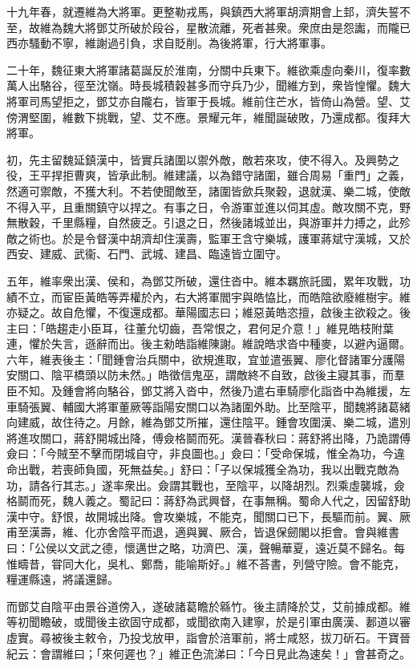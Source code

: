 \begin{pinyinscope}
十九年春，就遷維為大將軍。更整勒戎馬，與鎮西大將軍胡濟期會上邽，濟失誓不至，故維為魏大將鄧艾所破於段谷，星散流離，死者甚衆。衆庶由是怨讟，而隴已西亦騷動不寧，維謝過引負，求自貶削。為後將軍，行大將軍事。

二十年，魏征東大將軍諸葛誕反於淮南，分關中兵東下。維欲乘虛向秦川，復率數萬人出駱谷，徑至沈嶺。時長城積穀甚多而守兵乃少，聞維方到，衆皆惶懼。魏大將軍司馬望拒之，鄧艾亦自隴右，皆軍于長城。維前住芒水，皆倚山為營。望、艾傍渭堅圍，維數下挑戰，望、艾不應。景耀元年，維聞誕破敗，乃還成都。復拜大將軍。

初，先主留魏延鎮漢中，皆實兵諸圍以禦外敵，敵若來攻，使不得入。及興勢之役，王平捍拒曹爽，皆承此制。維建議，以為錯守諸圍，雖合周易「重門」之義，然適可禦敵，不獲大利。不若使聞敵至，諸圍皆歛兵聚穀，退就漢、樂二城，使敵不得入平，且重關鎮守以捍之。有事之日，令游軍並進以伺其虛。敵攻關不克，野無散穀，千里縣糧，自然疲乏。引退之日，然後諸城並出，與游軍并力搏之，此殄敵之術也。於是令督漢中胡濟却住漢壽，監軍王含守樂城，護軍蔣斌守漢城，又於西安、建威、武衞、石門、武城、建昌、臨遠皆立圍守。

五年，維率衆出漢、侯和，為鄧艾所破，還住沓中。維本羈旅託國，累年攻戰，功績不立，而宦臣黃皓等弄權於內，右大將軍閻宇與皓恊比，而皓陰欲廢維樹宇。維亦疑之。故自危懼，不復還成都。華陽國志曰；維惡黃皓恣擅，啟後主欲殺之。後主曰：「皓趨走小臣耳，往董允切齒，吾常恨之，君何足介意！」維見皓枝附葉連，懼於失言，遜辭而出。後主勑皓詣維陳謝。維說皓求沓中種麥，以避內逼爾。六年，維表後主：「聞鍾會治兵關中，欲規進取，宜並遣張翼、廖化督諸軍分護陽安關口、陰平橋頭以防未然。」皓徵信鬼巫，謂敵終不自致，啟後主寢其事，而羣臣不知。及鍾會將向駱谷，鄧艾將入沓中，然後乃遣右車騎廖化詣沓中為維援，左車騎張翼、輔國大將軍董厥等詣陽安關口以為諸圍外助。比至陰平，聞魏將諸葛緒向建威，故住待之。月餘，維為鄧艾所摧，還住陰平。鍾會攻圍漢、樂二城，遣別將進攻關口，蔣舒開城出降，傅僉格鬬而死。漢晉春秋曰：蔣舒將出降，乃詭謂傅僉曰：「今賊至不擊而閉城自守，非良圖也。」僉曰：「受命保城，惟全為功，今違命出戰，若喪師負國，死無益矣。」舒曰：「子以保城獲全為功，我以出戰克敵為功，請各行其志。」遂率衆出。僉謂其戰也，至陰平，以降胡烈。烈乘虛襲城，僉格鬬而死，魏人義之。蜀記曰：蔣舒為武興督，在事無稱。蜀命人代之，因留舒助漢中守。舒恨，故開城出降。會攻樂城，不能克，聞關口已下，長驅而前。翼、厥甫至漢壽，維、化亦舍陰平而退，適與翼、厥合，皆退保劒閣以拒會。會與維書曰：「公侯以文武之德，懷邁世之略，功濟巴、漢，聲暢華夏，遠近莫不歸名。每惟疇昔，甞同大化，吳札、鄭喬，能喻斯好。」維不荅書，列營守險。會不能克，糧運縣遠，將議還歸。

而鄧艾自陰平由景谷道傍入，遂破諸葛瞻於緜竹。後主請降於艾，艾前據成都。維等初聞瞻破，或聞後主欲固守成都，或聞欲南入建寧，於是引軍由廣漢、郪道以審虛實。尋被後主敕令，乃投戈放甲，詣會於涪軍前，將士咸怒，拔刀斫石。干寶晉紀云：會謂維曰；「來何遲也？」維正色流涕曰：「今日見此為速矣！」會甚奇之。


\end{pinyinscope}

